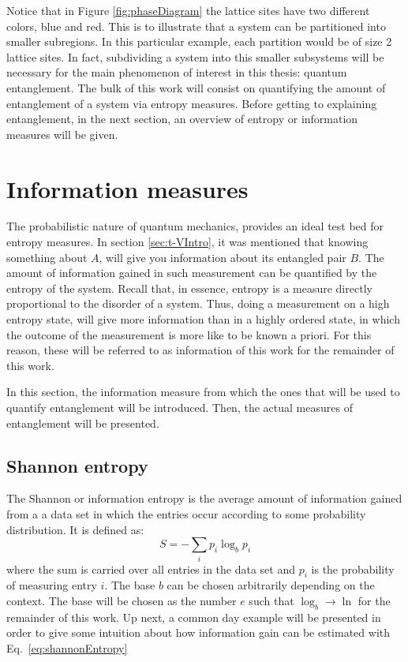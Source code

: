 Notice that in Figure \ref{fig:phaseDiagram} the lattice sites have two different colors, blue and red. This is to illustrate that a system can be partitioned into smaller subregions. In this particular example, each partition would be of size 2 lattice sites. In fact, subdividing a system into this smaller subsystems will be necessary for the main phenomenon of interest in this thesis: quantum entanglement. The bulk of this work will consist on quantifying the amount of entanglement of a system via entropy measures. Before getting to explaining entanglement, in the next section, an overview of entropy or information measures will be given.

\section{Information measures}
\label{sec:informationMeasures}

	The probabilistic nature of quantum mechanics, provides an ideal test bed for entropy measures. In section \ref{sec:t-VIntro}, it was mentioned that knowing something about $A$, will give you information about its entangled pair $B$. The amount of information gained in such measurement can be quantified by the entropy of the system. Recall that, in essence, entropy is a measure directly proportional to the disorder of a system. Thus, doing a measurement on a high entropy state, will give more information than in a highly ordered state, in which the outcome of the measurement is more like to be known a priori. For this reason, these will be referred to as information of this work for the remainder of this work.
	
	In this section, the information measure from which the ones that will be used to quantify entanglement will be introduced. Then, the actual measures of entanglement will be presented.
	
	\subsection{Shannon entropy}
	
	The Shannon or information entropy is the average amount of information gained from a a data set in which the entries occur according to some probability distribution. It is defined as:
	\begin{equation}
	S = -\sum_{i} p_i \log_{b} p_i
	\label{eq:shannonEntropy}
	\end{equation}
	where the sum is carried over all entries in the data set and $p_i$ is the probability of measuring entry $i$. The base $b$ can be chosen arbitrarily depending on the context. The base will be chosen as the number $e$ such that $\log_b \to \ln$ for the remainder of this work. Up next, a common day example will be presented in order to give some intuition about how information gain can be estimated with Eq.~\eqref{eq:shannonEntropy}
	
